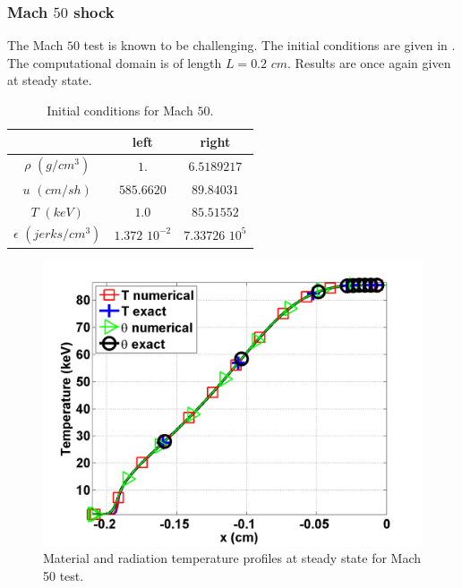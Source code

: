 \subsubsection{Mach $50$ shock} 

The Mach $50$ test is known to be challenging. The initial conditions are given in . The computational domain is of length $L=0.2$ $cm$. Results are once again given at steady state.
\begin{table}[H]
\caption{\label{tbl:table7} Initial conditions for Mach $50$.}
\begin{center}
\begin{tabular}{|c|c|c|}
\hline 
 & left  & right \\ \hline
$\rho$ $(g/cm^3)$ &$1.$ & $6.5189217$ \\ \hline
$u$ $(cm/sh)$& $585.6620$ & $89.84031$ \\ \hline
$T$ $(keV)$& $1.0$ & $85.51552$\\ \hline
$\epsilon$ $(jerks/cm^3)$ & $1.372$ $10^{-2}$ & $7.33726$ $10^{5}$\\
\hline
\end{tabular}  
\end{center}  
\end{table}
\begin{figure}[H]
                \centering
                \includegraphics[width=\textwidth]{figures/Mach_50_nel_1000_temperature.png}
        \caption{Material and radiation temperature profiles at steady state for Mach 50 test.}\label{fig:Mach50_temp}
\end{figure}
